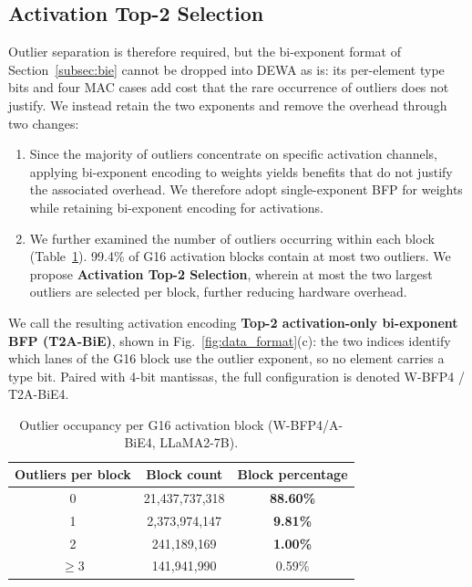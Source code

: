 \subsection{Activation Top-2 Selection}
Outlier separation is therefore required, but the bi-exponent format of Section~\ref{subsec:bie} cannot be dropped into DEWA as is: its per-element type bits and four MAC cases add cost that the rare occurrence of outliers does not justify.
We instead retain the two exponents and remove the overhead through two changes:
\begin{enumerate}
    \item Since the majority of outliers concentrate on specific activation channels, applying bi-exponent encoding to weights yields benefits that do not justify the associated overhead.
    We therefore adopt single-exponent BFP for weights while retaining bi-exponent encoding for activations.
    \item We further examined the number of outliers occurring within each block (Table~\ref{tab:outlier_count}).
    99.4\% of G16 activation blocks contain at most two outliers.
    We propose \textbf{Activation Top-2 Selection}, wherein at most the two largest outliers are selected per block, further reducing hardware overhead.
\end{enumerate}

We call the resulting activation encoding \textbf{Top-2 activation-only bi-exponent BFP (T2A-BiE)}, shown in Fig.~\ref{fig:data_format}(c): the two indices identify which lanes of the G16 block use the outlier exponent, so no element carries a type bit.
Paired with 4-bit mantissas, the full configuration is denoted W-BFP4 / T2A-BiE4.

\begin{table}[t]
    \centering
    \caption{Outlier occupancy per G16 activation block (W-BFP4/A-BiE4, LLaMA2-7B).}
    \label{tab:outlier_count}
    \begin{tabular*}{\columnwidth}{@{\extracolsep{\fill}}ccc}
        \toprule
        Outliers per block & Block count & Block percentage \\
        \midrule
        0 & 21{,}437{,}737{,}318 & \textbf{88.60\%} \\
        1 & 2{,}373{,}974{,}147 & \textbf{9.81\%} \\
        2 & 241{,}189{,}169 & \textbf{1.00\%} \\
        $\geq 3$ & 141{,}941{,}990 & 0.59\% \\
        \bottomrule
    \end{tabular*}
\end{table}

